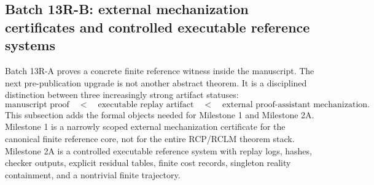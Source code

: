 \documentclass[11pt]{article}
\newcommand{\1}{\mathbf{1}}
\begin{document}
\subsection{Batch 13R-B: external mechanization certificates and controlled executable reference systems}
\label{subsec:batch13rb_external_mechanization_controlled_system}

Batch 13R-A proves a concrete finite reference witness inside the manuscript.  The next pre-publication upgrade is not another abstract theorem.  It is a disciplined distinction between three increasingly strong artifact statuses:
\[
\text{manuscript proof}
\quad < \quad
\text{executable replay artifact}
\quad < \quad
\text{external proof-assistant mechanization}.
\]
This subsection adds the formal objects needed for Milestone 1 and Milestone 2A.  Milestone 1 is a narrowly scoped external mechanization certificate for the canonical finite reference core, not for the entire RCP/RCLM theorem stack.  Milestone 2A is a controlled executable reference system with replay logs, hashes, checker outputs, explicit residual tables, finite cost records, singleton reality containment, and a nontrivial finite trajectory.
\end{document}
